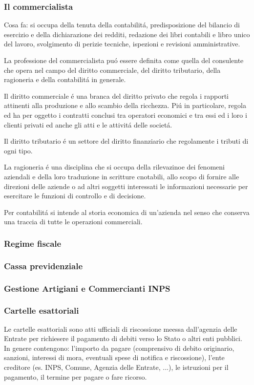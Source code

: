 \documentclass{article}
\begin{document}
\subsubsection{Il commercialista}
Cosa fa: si occupa della tenuta della contabilit\'a, 
predisposizione del bilancio di esercizio e della dichiarazione dei redditi, 
redazione dei libri contabili e libro unico del lavoro, 
svolgimento di perizie tecniche, ispezioni e revisioni amministrative.

La professione del commercialista pu\'o essere definita come quella del consulente che opera 
nel campo del diritto commerciale, del diritto tributario, della ragioneria e della contabilit\'a in generale.

Il diritto commerciale \'e una branca del diritto privato che regola i rapporti attinenti alla produzione e allo scambio della ricchezza. Pi\'u in particolare, regola ed ha per oggetto i contratti conclusi tra operatori economici e tra essi ed i loro i clienti privati ed anche gli atti e le attivit\'a delle societ\'a. 

Il diritto tributario \'e un settore del diritto finanziario che regolamente i tributi di ogni tipo.

La ragioneria \'e una disciplina che si occupa della rilevazinoe dei fenomeni aziendali e della loro traduzione in scritture cnotabili, allo scopo di fornire alle direzioni delle aziende 
o ad altri soggetti interessati le informazioni necessarie per esercitare le funzioni di controllo e di decisione.

Per contabilit\'a si intende al storia economica di un'azienda nel senso che conserva una traccia di tutte le operazioni commerciali.

\subsubsection{Regime fiscale}
\subsubsection{Cassa previdenziale}
\subsubsection{Gestione Artigiani e Commercianti INPS}

\subsubsection{Cartelle esattoriali}
Le cartelle esattoriali sono atti ufficiali di riscossione meessa dall'agenzia delle Entrate per richiesere il pagamento di debiti verso lo Stato o altri enti pubblici. In genere contengono: l'importo da pagare (comprensivo di debito originario, sanzioni, interessi di mora, eventuali spese di notifica e riscossione), l'ente creditore (es. INPS, Comune, Agenzia delle Entrate, ...), le istruzioni per il pagamento, il termine per pagare o fare ricorso. 
\end{document}
